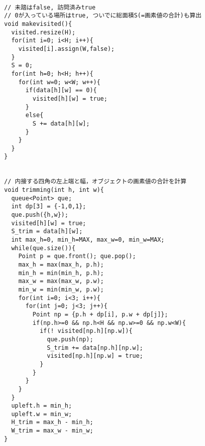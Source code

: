   \begin{lstlisting}[basicstyle=\ttfamily\footnotesize, frame=single]

  // 未踏はfalse, 訪問済みtrue
  // 0が入っている場所はtrue, ついでに総面積S(=画素値の合計)も算出
  void makevisited(){
    visited.resize(H);
    for(int i=0; i<H; i++){
      visited[i].assign(W,false);
    }
    S = 0;
    for(int h=0; h<H; h++){
      for(int w=0; w<W; w++){
        if(data[h][w] == 0){
          visited[h][w] = true;
        }
        else{
          S += data[h][w];
        }
      }
    }
  }


  // 内接する四角の左上端と幅，オブジェクトの画素値の合計を計算
  void trimming(int h, int w){
    queue<Point> que;
    int dp[3] = {-1,0,1};
    que.push({h,w});
    visited[h][w] = true; 
    S_trim = data[h][w];
    int max_h=0, min_h=MAX, max_w=0, min_w=MAX;
    while(que.size()){
      Point p = que.front(); que.pop();
      max_h = max(max_h, p.h);
      min_h = min(min_h, p.h);
      max_w = max(max_w, p.w);
      min_w = min(min_w, p.w);
      for(int i=0; i<3; i++){
        for(int j=0; j<3; j++){
          Point np = {p.h + dp[i], p.w + dp[j]};
          if(np.h>=0 && np.h<H && np.w>=0 && np.w<W){
            if(! visited[np.h][np.w]){
              que.push(np);
              S_trim += data[np.h][np.w];
              visited[np.h][np.w] = true;
            }
          }
        }
      }
    }
    upleft.h = min_h;
    upleft.w = min_w;
    H_trim = max_h - min_h;
    W_trim = max_w - min_w;
  }

     \end{lstlisting}